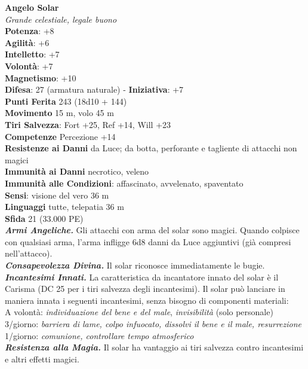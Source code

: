 \begin{multicols}{2}
\medskip\textbf{Angelo Solar}\\
\emph{Grande celestiale, legale buono}\\
\textbf{Potenza}: +8\\
\textbf{Agilità}: +6\\
\textbf{Intelletto}: +7\\
\textbf{Volontà}: +7\\
\textbf{Magnetismo}: +10\\
\textbf{Difesa}: 27 (armatura naturale) - \textbf{Iniziativa}: +7\\
\textbf{Punti Ferita} 243 (18d10 + 144)\\
\textbf{Movimento} 15 m, volo 45 m\\
\textbf{Tiri Salvezza}: Fort +25, Ref +14, Will +23\\
\textbf{Competenze} Percezione +14\\
\textbf{Resistenze ai Danni} da Luce; da botta, perforante e tagliente di attacchi non magici\\
\textbf{Immunità ai Danni} necrotico, veleno\\
\textbf{Immunità alle Condizioni}: affascinato, avvelenato, spaventato\\
\textbf{Sensi}: visione del vero 36 m\\
\textbf{Linguaggi} tutte, telepatia 36 m\\
\textbf{Sfida} 21 (33.000 PE)\smallskip\\
\emph{\textbf{Armi Angeliche.}} Gli attacchi con arma del solar sono magici. Quando colpisce con qualsiasi arma, l'arma infligge 6d8 danni da Luce aggiuntivi (già compresi nell'attacco).\\
\emph{\textbf{Consapevolezza Divina.}} Il solar riconosce immediatamente le bugie.\\
\emph{\textbf{Incantesimi Innati.}} La caratteristica da incantatore innato del solar è il Carisma (DC 25 per i tiri salvezza degli incantesimi). Il solar può lanciare in maniera innata i seguenti incantesimi, senza bisogno di componenti materiali:\\
A volontà: \emph{individuazione del bene e del male}, \emph{invisibilità} (solo personale)\\
3/giorno: \emph{barriera di lame, colpo infuocato, dissolvi il bene e il} \emph{male, resurrezione}\\
1/giorno: \emph{comunione, controllare tempo atmosferico}\\
\emph{\textbf{Resistenza alla Magia.}} Il solar ha vantaggio ai tiri salvezza contro incantesimi e altri effetti magici.\\

\end{multicols}
